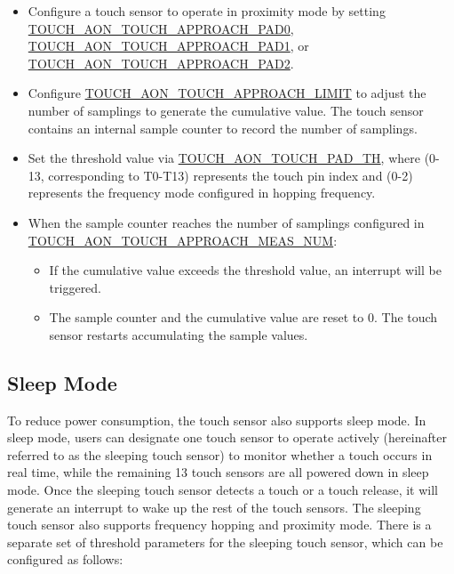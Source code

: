 \documentclass[main\_\_EN.tex]{subfiles}
\begin{document}
\begin{itemize}
    \item Configure a touch sensor to operate in proximity mode by setting \hyperref[fielddesc:TOUCHAONTOUCHAPPROACHPAD0]{TOUCH\_AON\_TOUCH\_APPROACH\_PAD0}, \hyperref[fielddesc:TOUCHAONTOUCHAPPROACHPAD1]{TOUCH\_AON\_TOUCH\_APPROACH\_PAD1}, or \hyperref[fielddesc:TOUCHAONTOUCHAPPROACHPAD2]{TOUCH\_AON\_TOUCH\_APPROACH\_PAD2}.
    \item Configure \hyperref[fielddesc:TOUCHAONTOUCHAPPROACHLIMIT]{TOUCH\_AON\_TOUCH\_APPROACH\_LIMIT} to adjust the number of samplings to generate the cumulative value. The touch sensor contains an internal sample counter to record the number of samplings.
    \item Set the threshold value via \hyperref[fielddesc:TOUCHAONTOUCHPAD0TH0]{TOUCH\_AON\_TOUCH\_PAD\_TH}, where  (0-13, corresponding to T0-T13) represents the touch pin index and  (0-2) represents the frequency mode configured in hopping frequency.
    \item When the sample counter reaches the number of samplings configured in \hyperref[fielddesc:TOUCHAONTOUCHAPPROACHMEASNUM0]{TOUCH\_AON\_TOUCH\_APPROACH\_MEAS\_NUM}:
    \begin{itemize}
        \item If the cumulative value exceeds the threshold value, an interrupt will be triggered.
        \item The sample counter and the cumulative value are reset to 0. The touch sensor restarts accumulating the sample values.
    \end{itemize}
\end{itemize}

\subsection{Sleep Mode}

To reduce power consumption, the touch sensor also supports sleep mode. In sleep mode, users can designate one touch sensor to operate actively (hereinafter referred to as the sleeping touch sensor) to monitor whether a touch occurs in real time, while the remaining 13 touch sensors are all powered down in sleep mode. Once the sleeping touch sensor detects a touch or a touch release, it will generate an interrupt to wake up the rest of the touch sensors. The sleeping touch sensor also supports frequency hopping and proximity mode. There is a separate set of threshold parameters for the sleeping touch sensor, which can be configured as follows:
\end{document}

